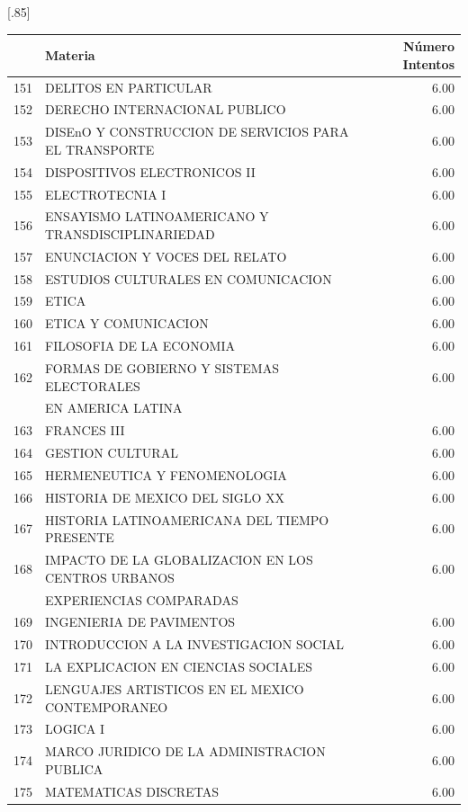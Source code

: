 \documentclass[12pt]{article}
\begin{document}
\begin{table}[ht]
\centering
\scalebox{0.75}[.85]{
\begin{tabular}{rlr}
  \hline
 & Materia & N\'umero Intentos \\ 
  \hline
  151 & DELITOS EN PARTICULAR & 6.00 \\ 
  152 & DERECHO INTERNACIONAL PUBLICO & 6.00 \\ 
  153 & DISEnO Y CONSTRUCCION DE SERVICIOS PARA EL TRANSPORTE & 6.00 \\ 
  154 & DISPOSITIVOS ELECTRONICOS II & 6.00 \\ 
  155 & ELECTROTECNIA I & 6.00 \\ 
  156 & ENSAYISMO LATINOAMERICANO Y TRANSDISCIPLINARIEDAD & 6.00 \\ 
  157 & ENUNCIACION Y VOCES DEL RELATO & 6.00 \\ 
  158 & ESTUDIOS CULTURALES EN COMUNICACION & 6.00 \\ 
  159 & ETICA & 6.00 \\ 
  160 & ETICA Y COMUNICACION & 6.00 \\ 
  161 & FILOSOFIA DE LA ECONOMIA & 6.00 \\ 
  162 & FORMAS DE GOBIERNO Y SISTEMAS ELECTORALES  & 6.00 \\ 
   &  EN AMERICA LATINA &  \\ 
  163 & FRANCES III & 6.00 \\ 
  164 & GESTION CULTURAL & 6.00 \\ 
  165 & HERMENEUTICA Y FENOMENOLOGIA & 6.00 \\ 
  166 & HISTORIA DE MEXICO DEL SIGLO XX & 6.00 \\ 
  167 & HISTORIA LATINOAMERICANA DEL TIEMPO PRESENTE & 6.00 \\ 
  168 & IMPACTO DE LA GLOBALIZACION EN LOS CENTROS URBANOS & 6.00 \\ 
  &  EXPERIENCIAS COMPARADAS &  \\ 
 169 & INGENIERIA DE PAVIMENTOS & 6.00 \\ 
  170 & INTRODUCCION A LA INVESTIGACION SOCIAL & 6.00 \\ 
  171 & LA EXPLICACION EN CIENCIAS SOCIALES & 6.00 \\ 
  172 & LENGUAJES ARTISTICOS EN EL MEXICO CONTEMPORANEO & 6.00 \\ 
  173 & LOGICA I & 6.00 \\ 
  174 & MARCO JURIDICO DE LA ADMINISTRACION PUBLICA & 6.00 \\ 
  175 & MATEMATICAS DISCRETAS & 6.00 \\ 

\end{tabular}}
\end{table}
\end{document}
